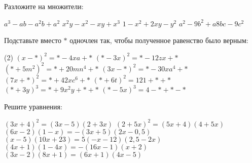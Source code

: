 \begin{class}[number=2]
	\begin{listofex}
		\item Разложите на множители: %
		\begin{tasks}
			\task \( a^3-ab-a^2b+a^2 \)
			\task \( x^2y-x^2-xy+x^3 \)
			\task \( 1-x^2+2xy-y^2 \)
			\task \( a^2-9b^2+a8bc-9c^2 \)
		\end{tasks}
		\item Подставьте вместо \(*\) одночлен так, чтобы полученное равенство было верным: %
		\begin{tasks}(2)
			\task \( (x-*)^2=*-4xa+* \)
			\task \( (*-3x)^2=*-12zx+* \)
			\task \( (*+5m^2)^2=*+20mn^4+* \)
			\task \( (3x-*)^2=*-30xa^4+* \)
			\task \( (7x+*)^2=*+42xc^6+* \)
			\task \( (*+6t)^2=121+*+* \)
			\task \( (*+3y)^3=*+9x^2y+*+*\)
			\task \( (*-5x)^3=4-*+*-* \)
		\end{tasks}
		\item Решите уравнения:
		\begin{tasks}
			\task \( (3x+4)^2=(3x-5)(2+3x) \)
			\task \( (2+5x)^2=(5x+4)(4+5x) \)
			\task \( (6x-2)(1-x)=-(3x+5)(2x-0,5) \)
			\task \( (x-5)(10x+23)=5(-x-12)(2,5-2x) \)
			\task \( (4x+1)(1-4x)=-(16x-1)(x+2) \)
			\task \( (3x-2)(8x+1)=(6x+1)(4x-5) \)
		\end{tasks}
	\end{listofex}
\end{class}

